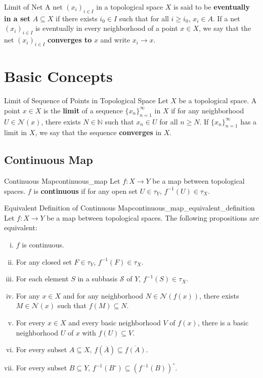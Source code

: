 \documentclass{report}
\begin{document}
\begin{definition}{Limit of Net}{}
	A net $\left(x_i\right)_{i \in I}$ in a topological space $X$ is said to be \textbf{eventually in a set} $A \subseteq X$ if there exists $i_0 \in I$ such that for all $i \geq i_0$, $x_i \in A$. If a net $\left(x_i\right)_{i \in I}$ is eventually in every neighborhood of a point $x \in X$, we say that the net $\left(x_i\right)_{i \in I}$ \textbf{converges to} $x$ and write $x_i \to x$.
\end{definition}



\section{Basic Concepts}


\begin{definition}{Limit of Sequence of Points in Topological Space}{}
	Let $X$ be a topological space. A point $x\in X$ is the \textbf{limit} of a sequence $\{x_n\}_{n=1}^\infty$ in $X$ if for any neighborhood $U\in\mathcal{N}(x)$, there exists $N\in\mathbb{N}$ such that $x_n\in U$ for all $n\ge N$. If $\{x_n\}_{n=1}^\infty$ has a limit in $X$, we say that the sequence \textbf{converges} in $X$.
\end{definition}

\subsection{Continuous Map}

\begin{definition}{Continuous Map}{continuous_map}
	Let $f:X\to Y$ be a map between topological spaces. $f$ is \textbf{continuous} if for any open set $U\in\tau_Y$, $f^{-1}(U)\in\tau_X$.
\end{definition}

\begin{proposition}{Equivalent Definition of Continuous Map}{continuous_map_equivalent_definition}
	Let $f:X\to Y$ be a map between topological spaces. The following propositions are equivalent:
	\begin{enumerate}[(i)]
		\item $f$ is continuous.
		\item For any closed set $F\in\tau_Y$, $f^{-1}(F)\in\tau_X$.
		\item For each element $S$ in a subbasis $\mathcal{S}$ of $Y$, $f^{-1}(S)\in\tau_X$.
		\item For any $x\in X$ and for any neighborhood $N\in\mathcal{N}(f(x))$, there exists $M\in\mathcal{N}(x)$ such that $f(M)\subseteq N$.
		\item For every $x \in X$ and every basic neighborhood $V$ of $f(x)$, there is a basic neighborhood $U$ of $x$ with $f(U) \subseteq V$.
		\item For every subset $A\subseteq X$, $f(\overline{A})\subseteq \overline{f(A)}$.
		\item For every subset $B\subseteq Y$, $f^{-1}(B^\circ)\subseteq (f^{-1}(B))^\circ$.
	\end{enumerate}
\end{proposition}
\end{document}
